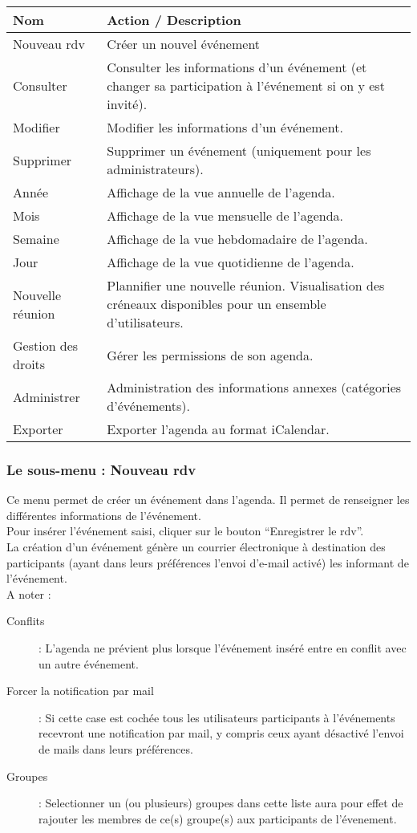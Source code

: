 \begin{tabular}{|p{2.5cm}|p{9.5cm}|}
\hline
\textbf{Nom} & \textbf{Action / Description} \\
\hline
Nouveau rdv & Créer un nouvel événement \\
\hline
Consulter & Consulter les informations d'un événement (et changer sa participation à l'événement si on y est invité).\\
\hline
Modifier & Modifier les informations d'un événement.\\
\hline
Supprimer & Supprimer un événement (uniquement pour les administrateurs).\\
\hline
Année & Affichage de la vue annuelle de l'agenda.\\
\hline
Mois & Affichage de la vue mensuelle de l'agenda.\\
\hline
Semaine & Affichage de la vue hebdomadaire de l'agenda.\\
\hline
Jour & Affichage de la vue quotidienne de l'agenda.\\
\hline
Nouvelle réunion & Plannifier une nouvelle réunion. Visualisation des créneaux disponibles pour un ensemble d'utilisateurs.\\
\hline
Gestion des droits & Gérer les permissions de son agenda.\\
\hline
Administrer & Administration des informations annexes (catégories d'événements).\\
\hline
Exporter & Exporter l'agenda au format iCalendar.\\
\hline
\end{tabular}


\subsubsection{Le sous-menu : Nouveau rdv}

Ce menu permet de créer un événement dans l'agenda.
Il permet de renseigner les différentes informations de l'événement.\\

Pour insérer l'événement saisi, cliquer sur le bouton ``Enregistrer le rdv''.\\

La création d'un événement génère un courrier électronique à destination des participants (ayant dans leurs préférences l'envoi d'e-mail activé) les informant de l'événement.\\

A noter :
\begin{description}
\item[Conflits] : L'agenda ne prévient plus lorsque l'événement inséré entre
en conflit avec un autre événement.
\item[Forcer la notification par mail] : Si cette case est cochée tous les
utilisateurs participants à l'événements recevront une notification par mail, y
compris ceux ayant désactivé l'envoi de mails dans leurs préférences.
\item[Groupes] : Selectionner un (ou plusieurs) groupes dans cette liste aura pour
effet de rajouter les membres de ce(s) groupe(s) aux participants de
l'évenement.
\end{description}

